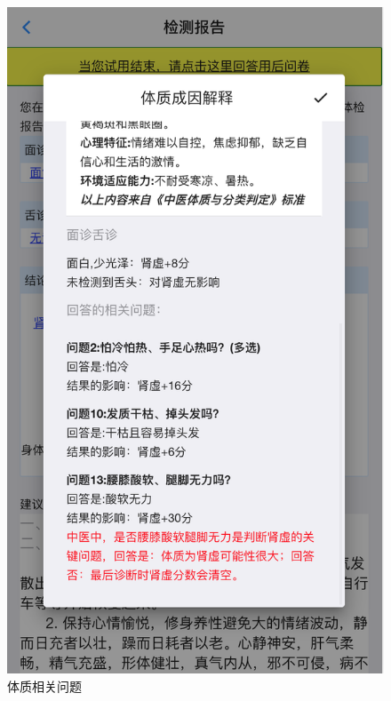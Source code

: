 \begin{figure}
    \centering
    \includegraphics{images/report6.png}
    \caption{体质相关问题}
    \label{fig:report_explain_phy_2}
\end{figure}

